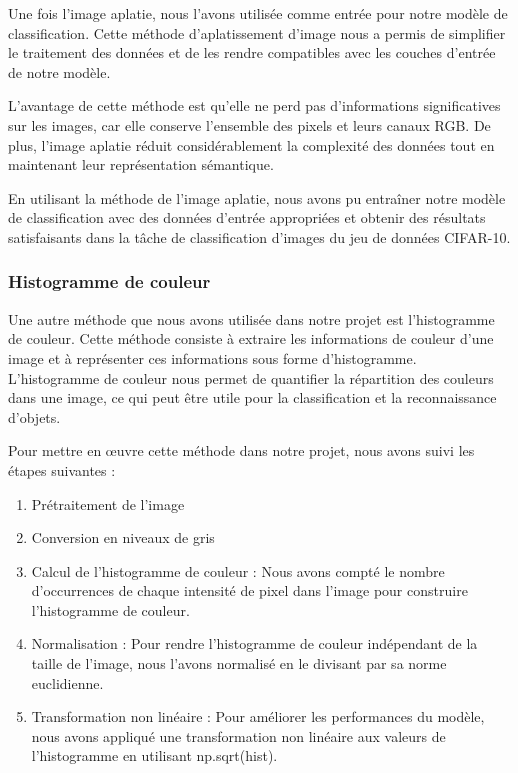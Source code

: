 Une fois l'image aplatie, nous l'avons utilisée comme entrée pour notre modèle de classification. Cette méthode d'aplatissement d'image nous a permis de simplifier le traitement des données et de les rendre compatibles avec les couches d'entrée de notre modèle.

L'avantage de cette méthode est qu'elle ne perd pas d'informations significatives sur les images, car elle conserve l'ensemble des pixels et leurs canaux RGB. De plus, l'image aplatie réduit considérablement la complexité des données tout en maintenant leur représentation sémantique.

En utilisant la méthode de l'image aplatie, nous avons pu entraîner notre modèle de classification avec des données d'entrée appropriées et obtenir des résultats satisfaisants dans la tâche de classification d'images du jeu de données CIFAR-10.

\subsubsection{Histogramme de couleur}

Une autre méthode que nous avons utilisée dans notre projet est l'histogramme de couleur. Cette méthode consiste à extraire les informations de couleur d'une image et à représenter ces informations sous forme d'histogramme. L'histogramme de couleur nous permet de quantifier la répartition des couleurs dans une image, ce qui peut être utile pour la classification et la reconnaissance d'objets.

Pour mettre en œuvre cette méthode dans notre projet, nous avons suivi les étapes suivantes :

\begin{enumerate}
    \item Prétraitement de l'image
    
    \item Conversion en niveaux de gris
    
    \item Calcul de l'histogramme de couleur : Nous avons compté le nombre d'occurrences de chaque intensité de pixel dans l'image pour construire l'histogramme de couleur.
    
    \item Normalisation : Pour rendre l'histogramme de couleur indépendant de la taille de l'image, nous l'avons normalisé en le divisant par sa norme euclidienne.
    
    \item Transformation non linéaire : Pour améliorer les performances du modèle, nous avons appliqué une transformation non linéaire aux valeurs de l'histogramme en utilisant np.sqrt(hist).
\end{enumerate}

